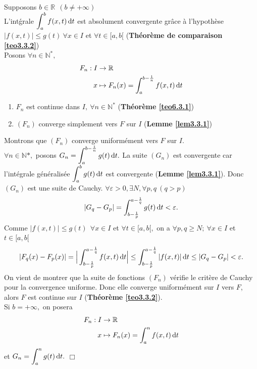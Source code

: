 \documentclass[11pt, a4paper]{book}
\newenvironment{pr}{\noindent {\bf Preuve} \noindent} {\hfill $\Box$\vskip 5mm}
\begin{document}
\begin{pr}\quad
Supposons $b\in \mathbb{R}~~(b\neq+\infty)$\\ L'int\'grale ${\displaystyle \int_a^bf(x,t)\,\mathrm{d} t}$ est absolument convergente gr\^ace \`a l'hypoth\`ese $|f(x,t)|\leq g(t)~\forall x\in I$ et $\forall t\in [a,b[$ (\textbf{Th\'eor\`eme de comparaison \ref{teo3.3.2}}) \\
Posons $\forall n\in \mathbb{N}^*,$ \begin{align*}
F_n:I&\rightarrow\mathbb{R}\\x&\mapsto F_n(x)=\int_a^{b-\frac{1}{n}}f(x,t)\,\mathrm{d} t
\end{align*}
\begin{enumerate}
\item $F_n$ est continue dans $I,~\forall n\in \mathbb{N}^*$ (\textbf{Th\'eor\`eme \ref{teo6.3.1}})
\item $(F_n)$ converge simplement vers $F$ sur $I$ (\textbf{Lemme \ref{lem3.3.1}})
\end{enumerate}
Montrons que $(F_n)$ converge uniform\'ement vers $F$ sur $I$.\\
$\forall n\in\mathbb{N}*,$ posons ${\displaystyle G_n=\int_a^{b-\frac{1}{n}}g(t)\,\mathrm{d} t}.$ La suite $(G_n)$ est convergente car l'int\'egrale g\'en\'eralis\'ee ${\displaystyle \int_a^b g(t)\,\mathrm{d} t}$ est convergente (\textbf{Lemme \ref{lem3.3.1}}). Donc $(G_n)$ est une suite de Cauchy. $\forall \varepsilon >0,\exists N,\forall p,q~(q>p)$ $$|G_q-G_p|=\int_{b-\frac{1}{p}}^{a-\frac{1}{q}}g(t)\,\mathrm{d} t <\varepsilon.$$ Comme $|f(x,t)|\leq g(t)~~\forall x\in I$ et $\forall t\in [a,b[,$ on a $\forall p,q\geq N;~\forall x\in I$ et $t\in [a,b[$ 
$$ |F_q(x)-F_p(x)|=\Big|\int_{b-\frac{1}{p}}^{a-\frac{1}{q}}f(x,t)\,\mathrm{d} t\Big|\leq \int_{b-\frac{1}{p}}^{a-\frac{1}{q}}|f(x,t)|\,\mathrm{d} t\leq |G_q-G_p|<\varepsilon.$$ 
On vient de montrer que la suite de fonctions $(F_n)$ v\'erifie le crit\`ere de Cauchy pour la convergence uniforme. Donc elle converge uniform\'ement sur $I$ vers $F$, alors $F$ est continue sur $I$ (\textbf{Th\'eor\`eme \ref{teo3.3.2}}).\\
Si $b=+\infty,$ on posera \begin{align*}
F_n:I&\rightarrow\mathbb{R}\\ x&\mapsto F_n(x)=\int_a^nf(x,t)\,\mathrm{d} t 
\end{align*}
et ${\displaystyle G_n=\int_a^ng(t)\,\mathrm{d} t}.$
\end{pr}
\end{document}
